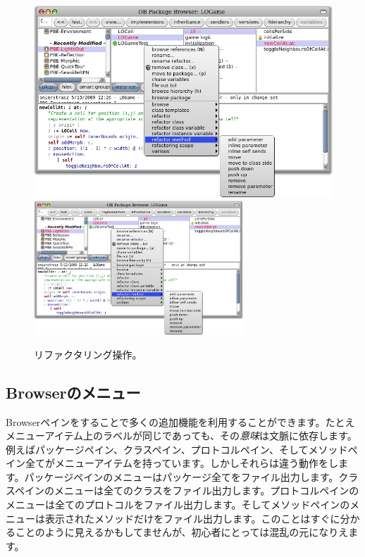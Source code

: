 \documentclass[a4paper,10pt,twoside]{book}
\begin{document}
\begin{figure}[btp]
	\begin{center}
	\ifluluelse
		{\includegraphics[width=\textwidth]{refactoring}}
		{\includegraphics[width=0.7\textwidth]{refactoring}}
	\end{center}
	\caption{リファクタリング操作。}
\end{figure}

\subsection{Browserのメニュー}

Browserペインを\actclick することで多くの追加機能を利用することができます。たとえメニューアイテム上のラベルが同じであっても、その\emph{意味}は文脈に依存します。例えばパッケージペイン、クラスペイン、プロトコルペイン、そしてメソッドペイン全てがメニューアイテムを持っています。しかしそれらは違う動作をします。パッケージペインのメニューはパッケージ全てをファイル出力します。クラスペインのメニューは全てのクラスをファイル出力します。プロトコルペインのメニューは全てのプロトコルをファイル出力します。そしてメソッドペインのメニューは表示されたメソッドだけをファイル出力します。このことはすぐに分かることのように見えるかもしてませんが、初心者にとっては混乱の元になりえます。
\end{document}
